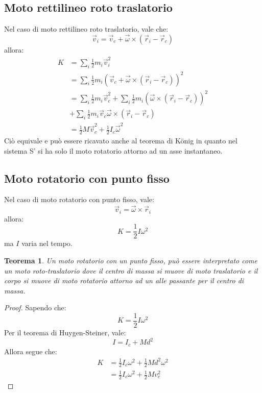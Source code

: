 \documentclass[11pt, a4paper, openright]{book}
\theoremstyle{plain}
\newtheorem{theorem}{Teorema}[section]
\theoremstyle{definition}
\begin{document}
\subsection{Moto rettilineo roto traslatorio}
Nel caso di moto rettilineo roto traslatorio, vale che:
\begin{equation}
    \vec{v}_i = \vec{v}_c + \vec{\omega} \times (\vec{r}_i - \vec{r}_c)
\end{equation}
allora:
\begin{align}
    K & = \sum_i \frac{1}{2}m_i\vec{v}_i^2 \\
      & = \sum_i \frac{1}{2}m_i(\vec{v}_c + \vec{\omega} \times (\vec{r}_i - \vec{r}_c))^2 \\
      & = \sum_i \frac{1}{2}m_i \vec{v}_c^2 +  \sum_i \frac{1}{2}m_i (\vec{\omega} \times (\vec{r}_i - \vec{r}_c))^2  \\ & + \sum_i \frac{1}{2}m_i \vec{v}_c \vec{\omega} \times (\vec{r}_i - \vec{r}_c) \\
      & = \frac{1}{2}M\vec{v}_c^2 + \frac{1}{2}I_c \vec{\omega}^2
\end{align}
Ciò equivale e può essere ricavato anche al teorema di K\"onig in quanto nel sistema S' si ha solo il moto rotatorio attorno ad un asse instantaneo.

\subsection{Moto rotatorio con punto fisso}
Nel caso di moto rotatorio con punto fisso, vale:
\begin{equation}
    \vec{v}_i = \vec{\omega} \times \vec{r}_i
\end{equation}
allora:
\begin{equation}
    K = \frac{1}{2}I\omega^2
\end{equation}
ma $I$ varia nel tempo.

\begin{theorem}
    Un moto rotatorio con un punto fisso, può essere interpretato come un moto roto-traslatorio dove il centro di massa si muove di moto traslatorio e il corpo si muove di moto rotatorio attorno ad un alle passante per il centro di massa.    
\end{theorem}
\begin{proof}
    Sapendo che:
    \begin{equation}
        K = \frac{1}{2} I \omega^2
    \end{equation}
    Per il teorema di Huygen-Steiner, vale:
    \begin{equation}
        I = I_c + Md^2
    \end{equation}
    Allora segue che:
    \begin{align}
        K & = \frac{1}{2}I_c \omega^2 + \frac{1}{2}Md^2\omega^2 \\
          & = \frac{1}{2}I_c \omega^2 + \frac{1}{2}Mv_c^2
    \end{align}
\end{proof}
\end{document}
